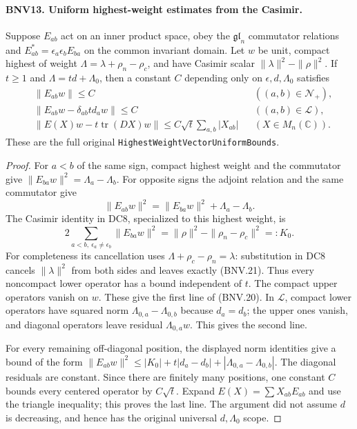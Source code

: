 \documentclass[11pt,a4paper]{article}
\numberwithin{equation}{section}
\theoremstyle{remark}\newtheorem{remark}[theorem]{Remark}
\begin{document}
\paragraph{BNV13. Uniform highest-weight estimates from the Casimir.}
\label{claim:BNV13}
Suppose $E_{ab}$ act on an inner product space, obey the
$\mathfrak{gl}_n$ commutator relations and
$E_{ab}^*=\epsilon_a\epsilon_b E_{ba}$ on the common invariant domain.
Let $w$ be unit, compact highest of weight
$\Lambda=\lambda+\rho_n-\rho_c$, and have Casimir scalar
$\|\lambda\|^2-\|\rho\|^2$.  If $t\ge1$ and
$\Lambda=td+\Lambda_0$, then a constant $C$ depending only on
$\epsilon,d,\Lambda_0$ satisfies
\[
 \begin{aligned}
 &\|E_{ab}w\|\le C &&((a,b)\in\mathcal N_+),\\
 &\|E_{ab}w-\delta_{ab}td_aw\|\le C
                  &&((a,b)\in\mathcal L),\\
 &\left\|E(X)w-t\operatorname{tr}(DX)w\right\|
       \le C\sqrt t\sum_{a,b}|X_{ab}| &&(X\in M_n(\mathbb C)).
 \end{aligned}
 \tag{BNV.20}
\]
These are the full original \texttt{Highest\allowbreak Weight\allowbreak Vector\allowbreak Uniform\allowbreak Bounds}.

\begin{proof}
For $a<b$ of the same sign, compact highest weight and the commutator
give $\|E_{ba}w\|^2=\Lambda_a-\Lambda_b$.
For opposite signs the adjoint relation and the same commutator give
\[
 \|E_{ab}w\|^2=\|E_{ba}w\|^2+\Lambda_a-\Lambda_b.
\]
The Casimir identity in DC8, specialized to this highest weight, is
\[
 2\sum_{a<b,\ \epsilon_a\ne\epsilon_b}\|E_{ba}w\|^2
       =\|\rho\|^2-\|\rho_n-\rho_c\|^2=:K_0.
 \tag{BNV.21}
\]
For completeness its cancellation uses
$\Lambda+\rho_c-\rho_n=\lambda$: substitution in DC8 cancels
$\|\lambda\|^2$ from both sides and leaves exactly (BNV.21).
Thus every noncompact lower operator has a bound independent of $t$.
The compact upper operators vanish on $w$.  These give the first line
of (BNV.20).  In $\mathcal L$, compact lower operators have squared norm
$\Lambda_{0,a}-\Lambda_{0,b}$ because $d_a=d_b$; the upper ones vanish,
and diagonal operators leave residual $\Lambda_{0,a}w$.  This gives the
second line.

For every remaining off-diagonal position, the displayed norm identities
give a bound of the form
$\|E_{ab}w\|^2\le |K_0|+t|d_a-d_b|+|\Lambda_{0,a}-\Lambda_{0,b}|$.
The diagonal residuals are constant.  Since there are finitely many
positions, one constant $C$ bounds every centered operator by $C\sqrt t$.
Expand $E(X)=\sum X_{ab}E_{ab}$ and use the triangle inequality; this
proves the last line.  The argument did not assume $d$ is decreasing,
and hence has the original universal $d,\Lambda_0$ scope.
\end{proof}
\end{document}
